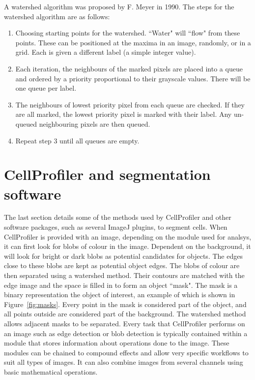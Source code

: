 A watershed algorithm was proposed by F. Meyer in 1990. The steps for the watershed algorithm are as follows:
\begin{enumerate}
	\item Choosing starting points for the watershed. ``Water" will ``flow" from these points. These can be positioned at the maxima in an image, randomly, or in a grid. Each is given a different label (a simple integer value).
	\item Each iteration, the neighbours of the marked pixels are placed into a queue and ordered by a priority proportional to their grayscale values. There will be one queue per label.
	\item The neighbours of lowest priority pixel from each queue are checked. If they are all marked, the lowest priority pixel is marked with their label. Any un-queued neighbouring pixels are then queued.
	\item Repeat step 3 until all queues are empty.
\end{enumerate}

\section{CellProfiler and segmentation software}

The last section details some of the methods used by CellProfiler and other software packages, such as several ImageJ plugins, to segment cells. When CellProfiler is provided with an image, depending on the module used for analsys, it can first look for blobs of colour in the image. Dependent on the background, it will look for bright or dark blobs as potential candidates for objects. The edges close to these blobs are kept as potential object edges. The blobs of colour are then separated using a watershed method. Their contours are matched with the edge image and the space is filled in to form an object ``mask". The mask is a binary representation the object of interest, an example of which is shown in Figure~\ref{fig:masks}. Every point in the mask is considered part of the object, and all points outside are considered part of the background. The watershed method allows adjacent masks to be separated. Every task that CellProfiler performs on an image such as edge detection or blob detection is typically contained within a module that stores information about operations done to the image. These modules can be chained to compound effects and allow very specific workflows to suit all types of images. It can also combine images from several channels using basic mathematical operations.

